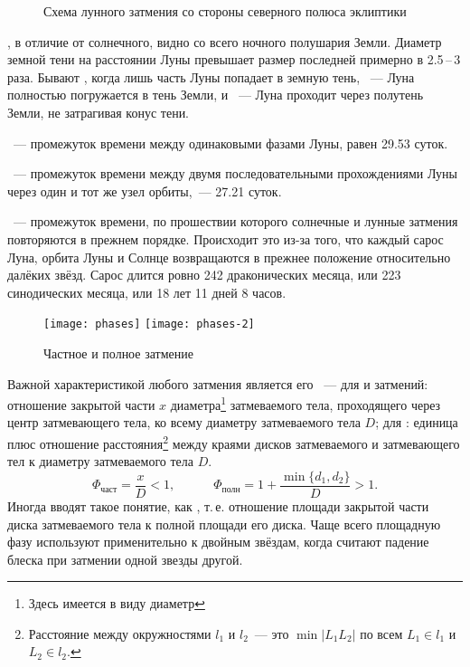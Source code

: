 \begin{figure}[h!]
	\caption{Схема лунного затмения со стороны северного полюса эклиптики}
	\label{fig:moon-eclipse-scheme}
\end{figure}
, в отличие от солнечного, видно со всего ночного полушария Земли. Диаметр земной тени на расстоянии Луны превышает размер последней примерно в 2.5\,--\,3 раза. Бывают , когда лишь часть Луны попадает в земную тень, ~--- Луна полностью погружается в тень Земли, и ~--- Луна проходит через полутень Земли, не затрагивая конус тени.

~--- промежуток времени между одинаковыми фазами Луны, равен 29.53 суток.

~--- промежуток времени между двумя последовательными прохождениями Луны через один и тот же узел орбиты,~--- 27.21 суток.

~--- промежуток  времени, по прошествии которого солнечные и лунные затмения повторяются в прежнем порядке. Происходит это из-за того, что каждый сарос Луна, орбита Луны и Солнце возвращаются в прежнее положение относительно далёких звёзд. Сарос длится ровно 242 драконических месяца, или 223 синодических месяца, или 18 лет 11 дней 8 часов.

\begin{wrapfigure}[8]{r}{.42\tw}
	\centering
	\vspace{-1pc}
	\texttt{[image: phases]}
	\hfill
	\texttt{[image: phases-2]}
	\caption{Частное и полное затмение}
	\label{fig:part-eclipses-scheme}
\end{wrapfigure}
Важной характеристикой любого затмения является его ~--- для  и  затмений: отношение закрытой части $x$ диаметра\footnote{Здесь имеется в виду  диаметр} затмеваемого тела, проходящего через центр затмевающего тела, ко всему диаметру затмеваемого тела $D$; для : единица плюс отношение расстояния\footnote{Расстояние между окружностями $l_1$ и $l_2$~--- это $\min |L_1L_2|$ по всем $L_1 \in l_1$ и $L_2 \in l_2$.} между краями дисков затмеваемого и затмевающего тел к диаметру затмеваемого тела $D$.
\begin{equation}
	\Phi_{\text{част}} = \frac{x}{D} < 1, \quad \quad \quad \Phi_{\text{полн}} =  1 + \frac{\min\{d_1, d_2\}}{D} > 1.
\end{equation}
Иногда вводят такое понятие, как , т.\,е. отношение площади закрытой части диска затмеваемого тела к полной площади его диска. Чаще всего  площадную фазу используют применительно к двойным звёздам, когда считают падение блеска при затмении одной звезды другой.
